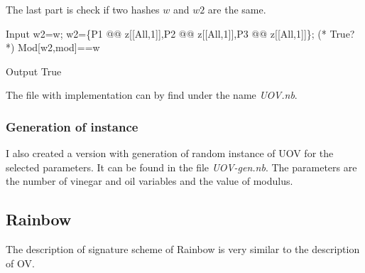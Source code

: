 \documentclass[thesis=M,english]{FITthesis}[2019/12/23]
\begin{document}
\bigskip
\noindent
The last part is check if two hashes $w$ and $w2$ are the same.
\begin{mmaCell}[moredefined={w2, w, P1, z, P2, P3, mod}]{Input}
  w2=w;
  w2=\{P1 @@ z[[All,1]],P2 @@ z[[All,1]],P3 @@ z[[All,1]]\};
  (* True? *)
  Mod[w2,mod]==w
\end{mmaCell}
\begin{mmaCell}[addtoindex=2]{Output}
  True
\end{mmaCell}
The file with implementation can by find under the name \textit{UOV.nb}.

\subsubsection{Generation of instance}
I also created a version with generation of random instance of UOV for the selected parameters. It can be found in the file \textit{UOV-gen.nb}. The parameters are the number of vinegar and oil variables and the value of modulus.

\subsection{Rainbow}
The description of signature scheme of Rainbow is very similar to the description of OV.
\end{document}
